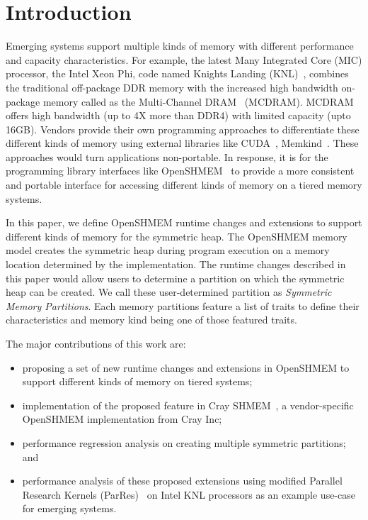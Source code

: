 \section{Introduction}
\label{src:intro}

Emerging systems support multiple kinds of memory with different
performance and capacity characteristics. For example, the latest
Many Integrated Core (MIC) processor, the Intel Xeon Phi,
code named Knights Landing (KNL)~\cite{KNL}, combines the traditional
off-package DDR memory with the increased high bandwidth on-package
memory called as the Multi-Channel DRAM~\cite{MCDRAM} (MCDRAM). MCDRAM
offers high bandwidth (up to 4X more than DDR4) with limited
capacity (upto 16GB). Vendors provide their own programming approaches
to differentiate these different kinds of memory using external libraries
like CUDA~\cite{cuda}, Memkind~\cite{memkind}. These approaches would
turn applications non-portable. In response, it is for the programming
library interfaces like OpenSHMEM~\cite{osm} to provide a more consistent
and portable interface for accessing different kinds of memory on a
tiered memory systems.

In this paper, we define OpenSHMEM runtime changes and extensions to
support different kinds of memory for the symmetric heap. The OpenSHMEM
memory model creates the symmetric heap during program execution on a
memory location determined by the implementation. The runtime changes
described in this paper would allow users to determine a partition on
which the symmetric heap can be created. We call these user-determined
partition as \emph{Symmetric Memory Partitions}. Each memory partitions
feature a list of traits to define their characteristics and memory
kind being one of those featured traits.

The major contributions of this work are:
\begin{itemize}
    \item proposing a set of new runtime changes and extensions in
    OpenSHMEM to support different kinds of memory on tiered systems;
    \item implementation of the proposed feature in
    Cray SHMEM~\cite{csma}, a vendor-specific OpenSHMEM implementation
    from Cray Inc;
    \item performance regression analysis on creating multiple symmetric
    partitions; and
    \item performance analysis of these proposed extensions using
    modified Parallel Research Kernels (ParRes)~\cite{parres} on Intel
    KNL processors as an example use-case for emerging systems.
\end{itemize}


